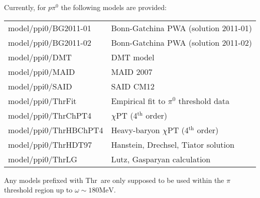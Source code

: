 \documentclass[a4paper,10pt]{article}
\def\tt{\ttfamily}
\def\rm{\rmfamily}
\begin{document}
Currently, for $p \pi^0$ the following models are provided: \vspace{-0.25em}\\
\begin{tabular}{ll}
\hspace{-0.5em}\tt model/ppi0/BG2011-01\rm & Bonn-Gatchina PWA (solution 2011-01) \cite{Model_BnGa} \vspace{-0.5em}\\
\hspace{-0.5em}\tt model/ppi0/BG2011-02\rm & Bonn-Gatchina PWA (solution 2011-02) \cite{Model_BnGa} \vspace{-0.5em}\\
\hspace{-0.5em}\tt model/ppi0/DMT\rm & DMT model \cite{Model_DMT} \vspace{-0.5em}\\
\hspace{-0.5em}\tt model/ppi0/MAID\rm & MAID 2007 \cite{Model_MAID} \vspace{-0.5em}\\
\hspace{-0.5em}\tt model/ppi0/SAID\rm & SAID CM12 \cite{Model_SAID} \vspace{-0.5em}\\
\hspace{-0.5em}\tt model/ppi0/ThrFit\rm & Empirical fit to $\pi^0$ threshold data \cite{PRL_pi0thres} \vspace{-0.5em}\\
\hspace{-0.5em}\tt model/ppi0/ThrChPT4\rm & $\chi$PT (4$^\mathrm{th}$ order) \cite{Model_ChPT4} \vspace{-0.5em}\\
\hspace{-0.5em}\tt model/ppi0/ThrHBChPT4\rm & Heavy-baryon $\chi$PT (4$^\mathrm{th}$ order) \cite{Model_ChPT4} \vspace{-0.5em}\\
\hspace{-0.5em}\tt model/ppi0/ThrHDT97\rm & Hanstein, Drechsel, Tiator solution \cite{Model_HDT97} \vspace{-0.5em}\\
\hspace{-0.5em}\tt model/ppi0/ThrLG\rm & Lutz, Gasparyan calculation \cite{Model_LG} \vspace{-0.1em}\\
\end{tabular}

Any models prefixed with \tt Thr\rm\ are only supposed to be used within the $\pi$ threshold region up to
$\omega\sim 180\mathrm{MeV}$.
\end{document}

